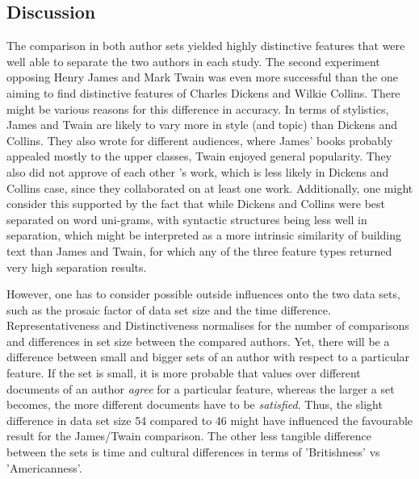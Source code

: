 \documentclass[a4paper,10pt,twoside,fleqn]{article}
\begin{document}
\subsection{Discussion}
The comparison in both author sets yielded highly distinctive features
that were well able to separate the two authors in each study. 
The second experiment opposing Henry James and Mark Twain was 
even more successful than the one aiming to find distinctive features 
of Charles Dickens and Wilkie Collins.
There might be various reasons for this difference in accuracy. 
In terms of stylistics, James and Twain are likely to vary more
in style (and topic) than Dickens and Collins. 
They also wrote for different audiences, where James' books probably
appealed mostly to the upper classes, Twain enjoyed general 
popularity. They also did not approve of each other 's work, which
is less likely in Dickens and Collins case, since they collaborated
on at least one work. 
Additionally, one might consider this supported by the fact that 
while Dickens and Collins were best separated on word uni-grams, 
with syntactic structures being less well in separation, which 
might be interpreted as a more intrinsic similarity of building
text than James and Twain, for which any of the three feature types
returned very high separation results. 

However, one has to consider possible outside influences 
onto the two data sets, such as the prosaic factor of data set size
and the time difference. 
Representativeness and Distinctiveness normalises for the number of 
comparisons and differences in set size between the compared authors.
Yet, there will be a difference between small and bigger sets of an 
author with respect to a particular feature. If the set is small, 
it is more probable that values over different documents of 
an author \emph{agree} for a particular feature, whereas the 
larger a set becomes, the more different documents have to be 
\emph{satisfied}. 
Thus, the slight difference in data set size 54 compared to 46
might have influenced the favourable result for the James/Twain
comparison. 
The other less tangible difference between the sets is time and
cultural differences in terms of 'Britishness' vs 'Americanness'.


\end{document}
